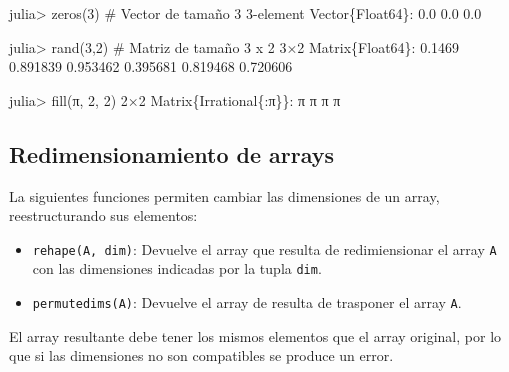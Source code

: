 \documentclass[
  letterpaper,
  DIV=11,
  numbers=noendperiod]{scrreprt}
\newenvironment{Shaded}{\begin{snugshade}}{\end{snugshade}}
\newcommand{\CommentTok}[1]{\textcolor[rgb]{0.37,0.37,0.37}{#1}}
\newcommand{\ConstantTok}[1]{\textcolor[rgb]{0.56,0.35,0.01}{#1}}
\newcommand{\DataTypeTok}[1]{\textcolor[rgb]{0.68,0.00,0.00}{#1}}
\newcommand{\FloatTok}[1]{\textcolor[rgb]{0.68,0.00,0.00}{#1}}
\newcommand{\FunctionTok}[1]{\textcolor[rgb]{0.28,0.35,0.67}{#1}}
\newcommand{\NormalTok}[1]{\textcolor[rgb]{0.00,0.23,0.31}{#1}}
\newcommand{\OperatorTok}[1]{\textcolor[rgb]{0.37,0.37,0.37}{#1}}
\providecommand{\tightlist}{%
  \setlength{\itemsep}{0pt}\setlength{\parskip}{0pt}}\usepackage{longtable,booktabs,array}
\begin{document}
\begin{Shaded}
\begin{Highlighting}[]
\NormalTok{julia}\OperatorTok{\textgreater{}} \FunctionTok{zeros}\NormalTok{(}\FloatTok{3}\NormalTok{)  }\CommentTok{\# Vector de tamaño 3}
\FloatTok{3}\OperatorTok{{-}}\NormalTok{element }\DataTypeTok{Vector}\NormalTok{\{}\DataTypeTok{Float64}\NormalTok{\}}\OperatorTok{:}
 \FloatTok{0.0}
 \FloatTok{0.0}
 \FloatTok{0.0}

\NormalTok{julia}\OperatorTok{\textgreater{}} \FunctionTok{rand}\NormalTok{(}\FloatTok{3}\NormalTok{,}\FloatTok{2}\NormalTok{)  }\CommentTok{\# Matriz de tamaño 3 x 2}
\FloatTok{3}\OperatorTok{×}\FloatTok{2} \DataTypeTok{Matrix}\NormalTok{\{}\DataTypeTok{Float64}\NormalTok{\}}\OperatorTok{:}
 \FloatTok{0.1469}    \FloatTok{0.891839}
 \FloatTok{0.953462}  \FloatTok{0.395681}
 \FloatTok{0.819468}  \FloatTok{0.720606}

\NormalTok{julia}\OperatorTok{\textgreater{}} \FunctionTok{fill}\NormalTok{(}\ConstantTok{π}\NormalTok{, }\FloatTok{2}\NormalTok{, }\FloatTok{2}\NormalTok{)}
\FloatTok{2}\OperatorTok{×}\FloatTok{2} \DataTypeTok{Matrix}\NormalTok{\{}\DataTypeTok{Irrational}\NormalTok{\{}\OperatorTok{:}\ConstantTok{π}\NormalTok{\}\}}\OperatorTok{:}
 \ConstantTok{π}  \ConstantTok{π}
 \ConstantTok{π}  \ConstantTok{π}
\end{Highlighting}
\end{Shaded}

\hypertarget{redimensionamiento-de-arrays}{%
\subsection{Redimensionamiento de
arrays}\label{redimensionamiento-de-arrays}}

La siguientes funciones permiten cambiar las dimensiones de un array,
reestructurando sus elementos:

\begin{itemize}
\tightlist
\item
  \texttt{rehape(A,\ dim)}: Devuelve el array que resulta de
  redimiensionar el array \texttt{A} con las dimensiones indicadas por
  la tupla \texttt{dim}.
\item
  \texttt{permutedims(A)}: Devuelve el array de resulta de trasponer el
  array \texttt{A}.
\end{itemize}

\begin{tcolorbox}[enhanced jigsaw, colbacktitle=quarto-callout-warning-color!10!white, coltitle=black, opacityback=0, opacitybacktitle=0.6, bottomtitle=1mm, leftrule=.75mm, toprule=.15mm, bottomrule=.15mm, toptitle=1mm, breakable, colframe=quarto-callout-warning-color-frame, colback=white, rightrule=.15mm, titlerule=0mm, title=\textcolor{quarto-callout-warning-color}{\faExclamationTriangle}\hspace{0.5em}{Warning}, arc=.35mm, left=2mm]
El array resultante debe tener los mismos elementos que el array
original, por lo que si las dimensiones no son compatibles se produce un
error.
\end{tcolorbox}
\end{document}
